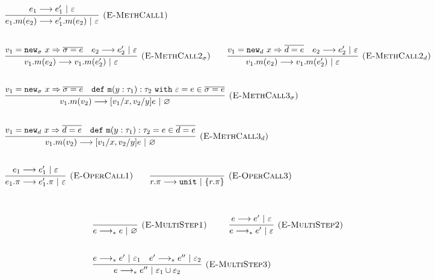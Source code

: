 \documentclass{llncs}
\newcommand{\keywadj}[1]{\mathtt{#1}}
\newcommand{\keyw}[1]{\keywadj{#1}~}
\begin{document}
\[
\begin{array}{lll}

	\infer[\textsc{(E-MethCall1)}]
		{e_1.m(e_2) \longrightarrow e_1'.m(e_2)~|~\varepsilon}
		{e_1 \longrightarrow e_1'~|~\varepsilon}\\[5ex]

	\infer[\textsc{(E-MethCall2$_{\sigma}$)}]
		{v_1.m(e_2) \longrightarrow v_1.m(e_2')~|~\varepsilon}
		{v_1 = \keywadj{new}_{\sigma}~x \Rightarrow \overline{\sigma = e} & e_2 \longrightarrow e_2'~|~\varepsilon}
				
		~~~~~~
	\infer[\textsc{(E-MethCall2$_d$)}]
		{v_1.m(e_2) \longrightarrow v_1.m(e_2')~|~\varepsilon}
		{v_1 = \keywadj{new}_{d}~x \Rightarrow \overline{d = e} & e_2 \longrightarrow e_2'~|~\varepsilon}
		\\[5ex]
		
	\infer[\textsc{(E-MethCall3$_{\sigma}$)}]
		{v_1.m(v_2)
			\longrightarrow
		 [v_1/x, v_2/y]e~|~\varnothing}
  		{v_1 = \keywadj{new}_{\sigma}~x \Rightarrow \overline{\sigma = e} & \keywadj{def~m}(y: \tau_1) : \tau_2~\keyw{with} \varepsilon = e \in \overline {\sigma = e}} \\[5ex]

	\infer[\textsc{(E-MethCall3$_{d}$)}]
		{v_1.m(v_2)
			\longrightarrow
		 [v_1/x, v_2/y]e~|~\varnothing}
  		{v_1 = \keywadj{new}_{d}~x \Rightarrow \overline{d = e} & \keywadj{def~m}(y: \tau_1) : \tau_2 = e \in \overline {d = e}} \\[5ex]
			
	\infer[\textsc{(E-OperCall1)}]
		{e_1.\pi
			\longrightarrow
		 e_1'.\pi~|~\varepsilon}
		{e_1 \longrightarrow e_1'~|~\varepsilon}
~~~~~~

			\infer[\textsc{(E-OperCall3)}]
		{r.\pi
			\longrightarrow
		 \keywadj{unit}~|~\{r.\pi\}}
		{} \\[5ex]
			
\end{array}
\]




\[
\begin{array}{lll}

	\infer[\textsc{(E-MultiStep1)}]
	{e \longrightarrow_* e~|~\varnothing}
	{} ~~~~~~~~
	
	\infer[\textsc{(E-MultiStep2)}]
	{e \longrightarrow_* e'~|~\varepsilon}
	{e \longrightarrow e'~|~\varepsilon} \\[5ex]

	\infer[\textsc{(E-MultiStep3)}]
	{e \longrightarrow_* e''~|~\varepsilon_1 \cup \varepsilon_2}
	{e \longrightarrow_* e'~|~\varepsilon_1 & e' \longrightarrow_* e''~|~\varepsilon_2}

\end{array}
\]
\end{document}
